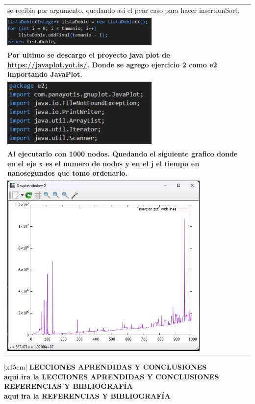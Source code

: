 \documentclass{article}
\begin{document}
\begin{longtable}{|p{15cm}|}
{			se recibia por argumento, quedando asi el peor caso para hacer insertionSort.}\\
			\includegraphics[width=0.6\textwidth,keepaspectratio]{img/generador.png}\\
			\textbf{Por ultimo se descargo el proyecto java plot de \url{https://javaplot.yot.is/}.
			Donde se agrego ejercicio 2 como e2 importando JavaPlot.}\\
			\includegraphics[width=0.6\textwidth,keepaspectratio]{img/importaciones.png}\\
			\textbf{Al ejecutarlo con 1000 nodos. Quedando el siguiente grafico donde en el
			eje x es el numero de nodos y en el j el tiempo en nanosegundos que tomo ordenarlo.}\\
			\includegraphics[width=0.8\textwidth,keepaspectratio]{img/plot.png}\\
			\hline
	\end{longtable}
	\begin{table}[H]
		\begin{tabular}{|x{15cm}|}
			\hline 
			\color{white}\textbf{LECCIONES APRENDIDAS Y CONCLUSIONES}  \\
			\hline 
			\textbf{aqui ira la LECCIONES APRENDIDAS Y CONCLUSIONES}  \\
			\hline 
			\color{white}\textbf{REFERENCIAS Y BIBLIOGRAFÍA}  \\
			\hline 
			\textbf{aqui ira la REFERENCIAS Y BIBLIOGRAFÍA}  \\
			\hline 
		\end{tabular}
	\end{table}
\end{document}
